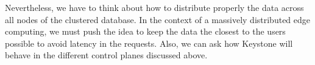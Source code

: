 Nevertheless, we have to think about how to distribute properly the data across all nodes of the clustered database. In the context of a massively distributed edge computing, we must push the idea to keep the data the closest to the users possible to avoid latency in the requests. Also, we can ask how Keystone will behave in the different control planes discussed above.
